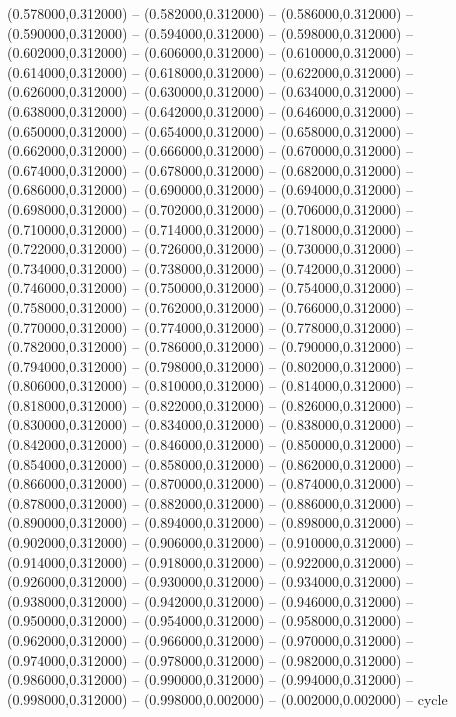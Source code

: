 (0.578000,0.312000) -- (0.582000,0.312000) -- (0.586000,0.312000) -- (0.590000,0.312000) -- (0.594000,0.312000) -- (0.598000,0.312000) -- (0.602000,0.312000) -- (0.606000,0.312000) -- (0.610000,0.312000) -- (0.614000,0.312000) -- (0.618000,0.312000) -- (0.622000,0.312000) -- (0.626000,0.312000) -- (0.630000,0.312000) -- (0.634000,0.312000) -- (0.638000,0.312000) -- (0.642000,0.312000) -- (0.646000,0.312000) -- (0.650000,0.312000) -- (0.654000,0.312000) -- (0.658000,0.312000) -- (0.662000,0.312000) -- (0.666000,0.312000) -- (0.670000,0.312000) -- (0.674000,0.312000) -- (0.678000,0.312000) -- (0.682000,0.312000) -- (0.686000,0.312000) -- (0.690000,0.312000) -- (0.694000,0.312000) -- (0.698000,0.312000) -- (0.702000,0.312000) -- (0.706000,0.312000) -- (0.710000,0.312000) -- (0.714000,0.312000) -- (0.718000,0.312000) -- (0.722000,0.312000) -- (0.726000,0.312000) -- (0.730000,0.312000) -- (0.734000,0.312000) -- (0.738000,0.312000) -- (0.742000,0.312000) -- (0.746000,0.312000) -- (0.750000,0.312000) -- (0.754000,0.312000) -- (0.758000,0.312000) -- (0.762000,0.312000) -- (0.766000,0.312000) -- (0.770000,0.312000) -- (0.774000,0.312000) -- (0.778000,0.312000) -- (0.782000,0.312000) -- (0.786000,0.312000) -- (0.790000,0.312000) -- (0.794000,0.312000) -- (0.798000,0.312000) -- (0.802000,0.312000) -- (0.806000,0.312000) -- (0.810000,0.312000) -- (0.814000,0.312000) -- (0.818000,0.312000) -- (0.822000,0.312000) -- (0.826000,0.312000) -- (0.830000,0.312000) -- (0.834000,0.312000) -- (0.838000,0.312000) -- (0.842000,0.312000) -- (0.846000,0.312000) -- (0.850000,0.312000) -- (0.854000,0.312000) -- (0.858000,0.312000) -- (0.862000,0.312000) -- (0.866000,0.312000) -- (0.870000,0.312000) -- (0.874000,0.312000) -- (0.878000,0.312000) -- (0.882000,0.312000) -- (0.886000,0.312000) -- (0.890000,0.312000) -- (0.894000,0.312000) -- (0.898000,0.312000) -- (0.902000,0.312000) -- (0.906000,0.312000) -- (0.910000,0.312000) -- (0.914000,0.312000) -- (0.918000,0.312000) -- (0.922000,0.312000) -- (0.926000,0.312000) -- (0.930000,0.312000) -- (0.934000,0.312000) -- (0.938000,0.312000) -- (0.942000,0.312000) -- (0.946000,0.312000) -- (0.950000,0.312000) -- (0.954000,0.312000) -- (0.958000,0.312000) -- (0.962000,0.312000) -- (0.966000,0.312000) -- (0.970000,0.312000) -- (0.974000,0.312000) -- (0.978000,0.312000) -- (0.982000,0.312000) -- (0.986000,0.312000) -- (0.990000,0.312000) -- (0.994000,0.312000) -- (0.998000,0.312000) -- (0.998000,0.002000) -- (0.002000,0.002000) -- cycle
